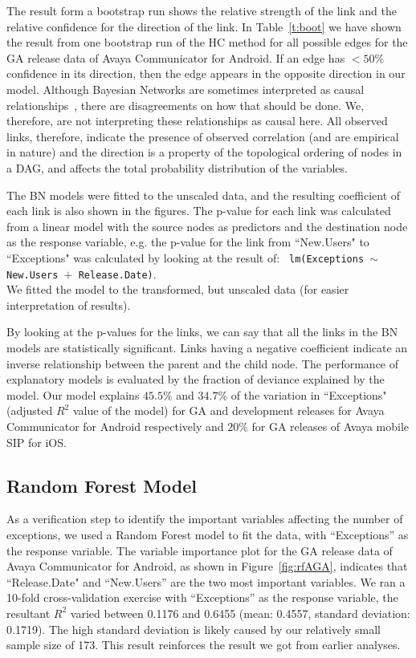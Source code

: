 \documentclass[smallextended]{svjour3}       %
\begin{document}
The result form a bootstrap run shows the relative strength of the
link and the relative confidence for the direction of the link. 
In Table~\ref{t:boot} we have shown the result from one bootstrap run of the HC method for all possible edges for the GA release data of Avaya Communicator for Android. If an edge has $<50\%$ confidence in its direction, then the edge appears in the opposite direction in our model.
Although Bayesian Networks are sometimes interpreted as causal relationships~\cite{pearl2011bayesian}, there are disagreements on how that should be done.
We, therefore, are not interpreting these relationships as causal here. All observed links, therefore, indicate the presence of observed correlation (and are empirical in nature) and the direction is a property of the topological ordering of nodes in a DAG, and affects the total probability distribution of the variables.

The BN models were fitted to
the unscaled data, and the resulting coefficient of each link is also shown
in the figures. The p-value for each link was calculated from a
linear model with the source nodes as predictors and the destination
node as the response variable, e.g. the p-value for the link from
``New.Users" to ``Exceptions" was calculated by looking at the
result of:  \texttt{  lm(Exceptions $\sim$ New.Users $+$ Release.Date)}. \\
We fitted the model to the transformed, but unscaled data (for easier interpretation of results). 

By looking at the p-values for the links, we can say that all the links in the BN models
are statistically significant. 
Links having a negative coefficient indicate an inverse relationship between the parent 
and the child node. The performance of explanatory models is evaluated by the fraction
of deviance explained by the model. Our model explains $45.5\%$ and $34.7\%$ of the
variation in ``Exceptions" (adjusted $R^2$ value of the model) for GA and development releases for Avaya Communicator for Android respectively and $20\%$ for GA releases of Avaya mobile SIP for iOS. 

\vspace{-10pt}
\subsection{Random Forest Model}
As a verification step to identify the important variables affecting the number of exceptions, we used a Random Forest model to fit the data, with ``Exceptions'' as the response variable. The variable importance plot for the GA release data of Avaya Communicator for Android, as shown in Figure~\ref{fig:rfAGA}, indicates that ``Release.Date" and ``New.Users'' are the two most important variables. We ran a 10-fold cross-validation exercise with ``Exceptions'' as the response variable, the resultant $R^2$ varied between 0.1176 and 0.6455 (mean: 0.4557, standard deviation: 0.1719). The high standard deviation is likely caused by our relatively small sample size of 173. This result reinforces the result we got from earlier analyses.
\end{document}
